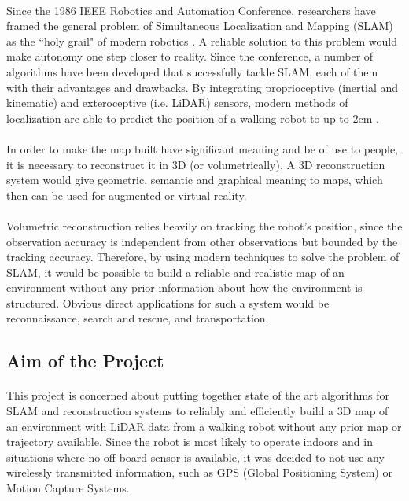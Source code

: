 \documentclass[12pt]{article}
\begin{document}
	\paragraph{}
	Since the 1986 IEEE Robotics and Automation Conference, researchers have framed the general problem of Simultaneous Localization and Mapping (SLAM) as the ``holy grail" of modern robotics \cite{SLAMPartI}. A reliable solution to this problem would make autonomy one step closer to reality. Since the conference, a number of algorithms have been developed that successfully tackle SLAM, each of them with their advantages and drawbacks. By integrating proprioceptive (inertial and kinematic) and exteroceptive (i.e. LiDAR) sensors, modern methods of localization are able to predict the position of a walking robot to up to 2cm \cite{7041346}.
	
	\paragraph{}
	In order to make the map built have significant meaning and be of use to people, it is necessary to reconstruct it in 3D (or volumetrically). A 3D reconstruction system would give geometric, semantic and graphical meaning to maps, which then can be used for augmented or virtual reality.
	
	\paragraph{}
	Volumetric reconstruction relies heavily on tracking the robot's position, since the observation accuracy is independent from other observations but bounded by the tracking accuracy. Therefore, by using modern techniques to solve the problem of SLAM, it would be possible to build a reliable and realistic map of an environment without any prior information about how the environment is structured. Obvious direct applications for such a system would be reconnaissance, search and rescue, and transportation.
	
	\subsection{Aim of the Project}
	\paragraph{}
	This project is concerned about putting together state of the art algorithms for SLAM and reconstruction systems to reliably and efficiently build a 3D map of an environment with LiDAR data from a walking robot without any prior map or trajectory available. Since the robot is most likely to operate indoors and in situations where no off board sensor is available, it was decided to not use any wirelessly transmitted information, such as GPS (Global Positioning System) or Motion Capture Systems.
	
\end{document}
